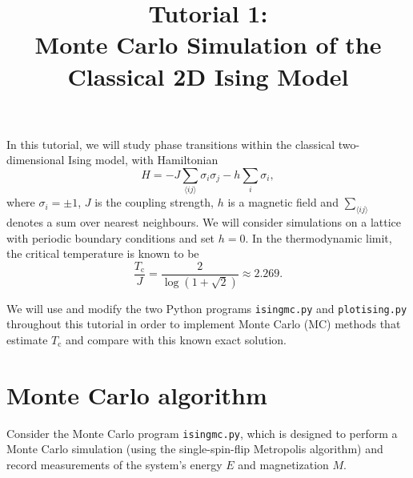 \documentclass[letterpaper]{scrartcl}
\begin{document}

\vspace{-3cm}

\title{Tutorial 1: \\ Monte Carlo Simulation of the \\ Classical 2D Ising Model}

\maketitle

In this tutorial, we will study phase transitions within the classical two-dimensional Ising model, with Hamiltonian
\begin{equation*}
H = -J \sum_{\langle ij \rangle} \sigma_i \sigma_j - h \sum_i \sigma_i,
\end{equation*}
where $\sigma_i = \pm 1$, $J$ is the coupling strength, $h$ is a magnetic field and $\sum_{\langle ij \rangle}$ denotes a sum over nearest neighbours.
We will consider simulations on a lattice with periodic boundary conditions and set $h=0$.
In the thermodynamic limit, the critical temperature is known to be 
\begin{equation*}
\frac{ T_\text{c} }{J} = \frac{2}{\log( 1 + \sqrt{2} )} \approx 2.269 .
\end{equation*}

We will use and modify the two Python programs \texttt{ising{\textunderscore}mc.py} and \texttt{plot{\textunderscore}ising.py} throughout this tutorial 
in order to implement Monte Carlo (MC) methods that estimate $T_\text{c}$ and compare with this known exact solution.

\section{Monte Carlo algorithm}
Consider the Monte Carlo program \texttt{ising{\textunderscore}mc.py}, which is designed to perform a Monte Carlo simulation (using the single-spin-flip Metropolis algorithm) and record measurements of the system's energy $E$ and magnetization $M$. 
\end{document}
